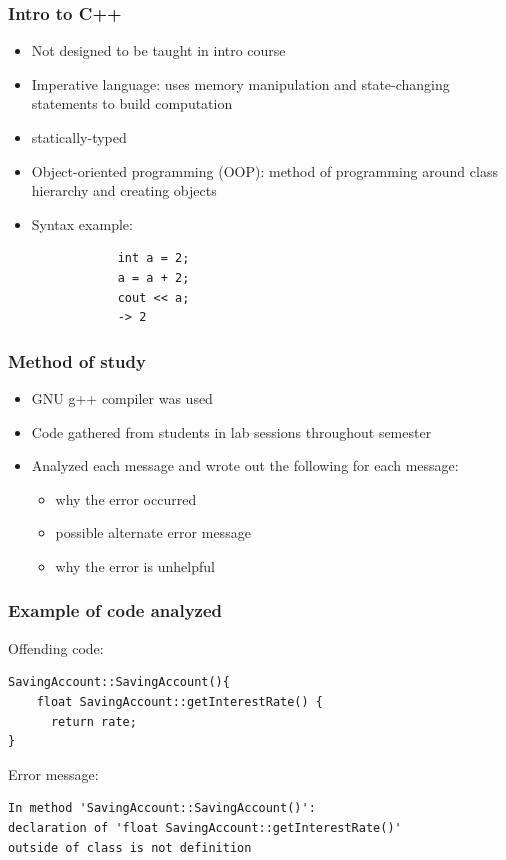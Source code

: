 \documentclass{beamer}
\begin{document}
\begin{frame}[fragile]
	\frametitle{Intro to C++}
		\begin{itemize}
			\item Not designed to be taught in intro course
			\item Imperative language: uses memory manipulation and state-changing statements to build computation
			\item statically-typed
			\item Object-oriented programming (OOP): method of programming around class hierarchy and creating objects
			\item Syntax example:
			\begin{verbatim}
			int a = 2;
			a = a + 2;
			cout << a;
			-> 2
			\end{verbatim}
		\end{itemize}

\end{frame}

\begin{frame}
	\frametitle{Method of study}
		\begin{itemize}
			\item GNU g++ compiler was used
			\item Code gathered from students in lab sessions throughout semester
			\item Analyzed each message and wrote out the following for each message:
			\begin{itemize}
				\item why the error occurred
				\item possible alternate error message
				\item why the error is unhelpful
			\end{itemize}
		\end{itemize}

\end{frame}

\begin{frame}[fragile]
	\frametitle{Example of code analyzed}
Offending code:
\begin{verbatim}
SavingAccount::SavingAccount(){
    float SavingAccount::getInterestRate() {
   	  return rate;
}
\end{verbatim}

Error message:
\begin{verbatim}
In method 'SavingAccount::SavingAccount()':
declaration of 'float SavingAccount::getInterestRate()'
outside of class is not definition
\end{verbatim}

\end{frame}
\end{document}

